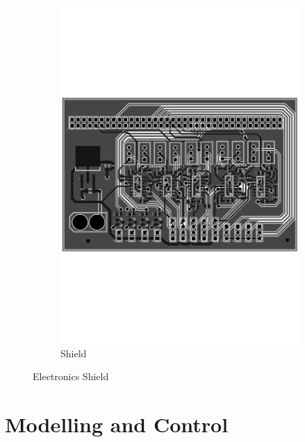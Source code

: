 \documentclass[11pt,a4paper]{article}
\begin{document}
\begin{figure}[hbt!]
\begin{subfigure}[t]{0.45\textwidth}
        \includegraphics[angle=270, origin=c, clip, trim=0cm 8cm 0cm 8cm, width=1.00\textwidth]{ShieldPCB.pdf}
        \caption{Shield}
        \label{fig:shield_photo}
    \end{subfigure}
    \caption{Electronics Shield}
    \label{fig:shield}
\end{figure}

\newpage
\section{Modelling and Control}
\label{section:modeling_and_control}
\end{document}

